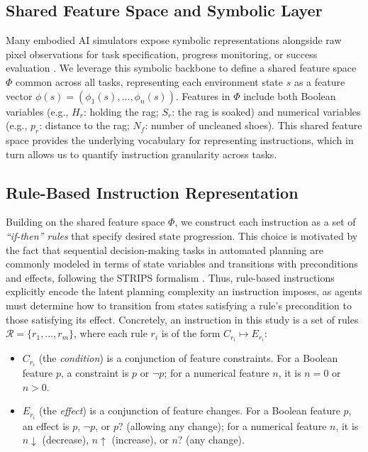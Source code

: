 \documentclass[11pt]{article}
\begin{document}
\subsection{Shared Feature Space and Symbolic Layer}
Many embodied AI simulators expose symbolic representations alongside raw pixel observations for task specification, progress monitoring, or success evaluation \citep{shridhar2020alfred, puig2020watchandhelp, li2022igibson, DBLP:conf/corl/0002ZWGSMWLLSAH22}. We leverage this symbolic backbone to define a shared feature space $\Phi$ common across all tasks, representing each environment state $s$ as a feature vector $\phi(s) = (\phi_1(s), \ldots, \phi_n(s))$. Features in $\Phi$ include both Boolean variables (e.g., $H_r$: holding the rag; $S_r$: the rag is soaked) and numerical variables (e.g., $p_r$: distance to the rag; $N_f$: number of uncleaned shoes). This shared feature space provides the underlying vocabulary for representing instructions, which in turn allows us to quantify instruction granularity across tasks.



\subsection{Rule-Based Instruction Representation}
Building on the shared feature space $\Phi$, we construct each instruction as a set of \emph{``if-then'' rules} that specify desired state progression. This choice is motivated by the fact that sequential decision-making tasks in automated planning are commonly modeled in terms of state variables and transitions with preconditions and effects, following the STRIPS formalism \citep{haslum2019introduction}. Thus, rule-based instructions explicitly encode the latent planning complexity an instruction imposes, as agents must determine how to transition from states satisfying a rule's precondition to those satisfying its effect. Concretely, an instruction in this study is a set of rules $\mathcal{R} = \{r_1, \ldots, r_m\}$, where each rule $r_i$ is of the form $C_{r_i} \mapsto E_{r_i}$:

\begin{itemize}[leftmargin=*]
    \item $C_{r_i}$ (the \emph{condition}) is a conjunction of feature constraints. For a Boolean feature $p$, a constraint is $p$ or $\lnot p$; for a numerical feature $n$, it is $n = 0$ or $n > 0$.
    \item $E_{r_i}$ (the \emph{effect}) is a conjunction of feature changes. For a Boolean feature $p$, an effect is $p$, $\lnot p$, or $p?$ (allowing any change); for a numerical feature $n$, it is $n\downarrow$ (decrease), $n\uparrow$ (increase), or $n?$ (any change).
\end{itemize}
\end{document}

